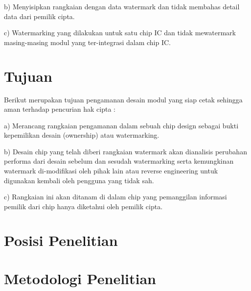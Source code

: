 b) Menyisipkan rangkaian dengan data watermark dan tidak membahas
detail data dari pemilik cipta.

c) Watermarking yang dilakukan untuk satu chip IC dan tidak mewatermark
masing-masing modul yang ter-integrasi dalam chip IC. 


\section{Tujuan}
Berikut merupakan tujuan pengamanan desain modul yang siap cetak
sehingga aman terhadap pencurian hak cipta :

a) Merancang rangkaian pengamanan dalam sebuah chip design sebagai
bukti kepemilikan desain (ownership) atau watermarking.

b) Desain chip yang telah diberi rangkaian watermark akan dianalisis
perubahan performa dari desain sebelum dan sesudah watermarking
serta kemungkinan watermark di-modifikasi oleh pihak lain atau
reverse engineering untuk digunakan kembali oleh pengguna yang tidak
sah.

c) Rangkaian ini akan ditanam di dalam chip yang pemanggilan informasi
pemilik dari chip hanya diketahui oleh pemilik cipta.


\section{Posisi Penelitian}


\section{Metodologi Penelitian}


